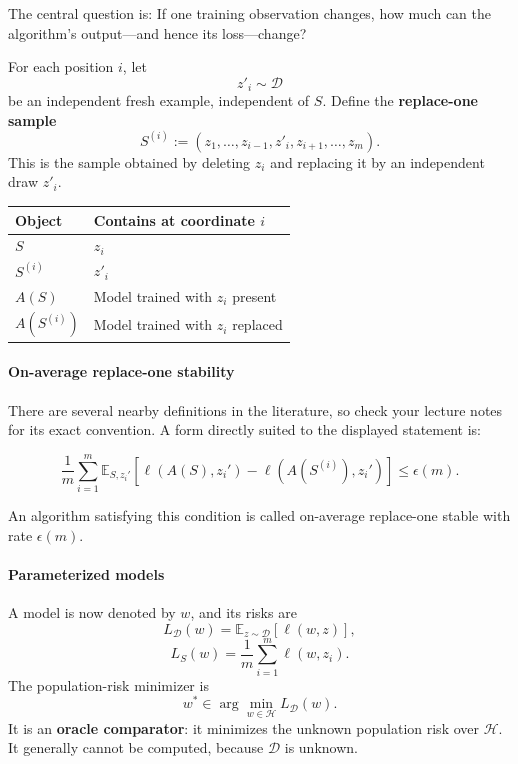 \documentclass[11pt,a4paper]{article}
\theoremstyle{definition}
\begin{document}
The central question is: If one training observation changes, how much can the algorithm’s output—and hence its loss—change?

For each position $i$, let
\[
z'_i \sim \mathcal{D}
\]
be an independent fresh example, independent of $S$. Define the \textbf{replace-one sample}
\[
\boxed{S^{(i)} := (z_1, \dots, z_{i-1}, z'_i, z_{i+1}, \dots, z_m).}
\]
This is the sample obtained by deleting $z_i$ and replacing it by an independent draw $z'_i$.

\begin{center}
\begin{tabular}{l|l}
  \hline
  \textbf{Object} & \textbf{Contains at coordinate $i$} \\ \hline
  $S$ & $z_i$ \\ \hline
  $S^{(i)}$ & $z'_i$ \\ \hline
  $A(S)$ & Model trained with $z_i$ present \\ \hline
  $A(S^{(i)})$ & Model trained with $z_i$ replaced \\ \hline
  \end{tabular}
\end{center}

\paragraph{On-average replace-one stability}

There are several nearby definitions in the literature, so check your lecture notes for its exact convention. A form directly suited to the displayed statement is:

\[
\frac{1}{m} \sum_{i=1}^{m} \mathbb{E}_{S, z_i'} \left[ \ell(A(S), z_i') - \ell(A(S^{(i)}), z_i') \right] \leq \epsilon(m). \tag{AROS}\label{eq:aros}
\]

An algorithm satisfying this condition is called on-average replace-one stable with rate $\epsilon(m)$.


\paragraph{Parameterized models}

A model is now denoted by $w$, and its risks are
\[
L_{\mathcal{D}}(w) = \mathbb{E}_{z \sim \mathcal{D}}[\ell(w, z)],
\]
\[
L_{S}(w) = \frac{1}{m} \sum_{i=1}^{m} \ell(w, z_i).
\]
The population-risk minimizer is
\[
\boxed{w^* \in \arg \min_{w \in \mathcal{H}} L_{\mathcal{D}}(w).}
\]
It is an \textbf{oracle comparator}: it minimizes the unknown population risk over $\mathcal{H}$. It generally cannot be computed, because $\mathcal{D}$ is unknown.
\end{document}
